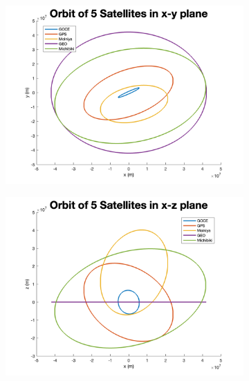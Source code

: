 \documentclass[12pt
,headinclude
,headsepline
,bibtotocnumbered
]{scrartcl}
\begin{document}
\begin{figure}[H]
    \centering
    \begin{subfigure}[b]{0.45\textwidth}
        \includegraphics[width=\textwidth]{plots/orbxy.png}
        \label{fig:image1}
    \end{subfigure}
    \begin{subfigure}[b]{0.45\textwidth}
        \includegraphics[width=\textwidth]{plots/orbxz.png}
        \label{fig:image2}
    \end{subfigure}
    \begin{subfigure}[b]{0.45\textwidth}

\end{subfigure}
\end{figure}
\end{document}
